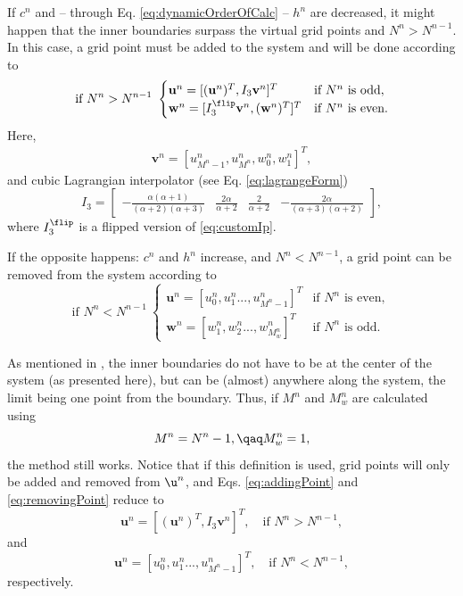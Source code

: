 If $c^n$ and -- through Eq. \eqref{eq:dynamicOrderOfCalc} -- $h^n$ are decreased, it might happen that the inner boundaries surpass the virtual grid points and $N^n > N^{n-1}$. In this case, a grid point must be added to the system and will be done according to
\begin{equation}\label{eq:addingPoint}
    \text{if } N^n>N^{n-1}\ \begin{cases}\mathbf{u}^n = [(\mathbf{u}^n)^T, I_3\mathbf{v}^n]^T & \text{if $N^n $ is odd},\\
    \mathbf{w}^n = [I_3^\flip\mathbf{v}^n, (\mathbf{w}^n)^T]^T & \text{if $ N^n$ is even}.
    \end{cases}
\end{equation}
Here, 
\begin{align*}
\mathbf{v}^n = [u_{M^n-1}^n, u_{M^n}^n, w_0^n, w_1^n]^T,%
\end{align*}
and cubic Lagrangian interpolator (see Eq. \eqref{eq:lagrangeForm})
\begin{equation}\label{eq:customIp}
I_3 = \begin{bmatrix} -\frac{\alpha(\alpha+1)}{(\alpha+2)(\alpha+3)} &\frac{2\alpha}{\alpha+2} &\frac{2}{\alpha+2} 
&-\frac{2\alpha}{(\alpha+3)(\alpha+2)}
\end{bmatrix},
\end{equation}
where $I_3^\flip$ is a flipped version of \eqref{eq:customIp}.

If the opposite happens: $c^n$ and $h^n$ increase, and $N^n<N^{n-1}$, a grid point can be removed from the system according to
\begin{equation}\label{eq:removingPoint}
\text{if } N^n<N^{n-1}\ \begin{cases}
    \mathbf{u}^n = [u_0^n, u_1^n ..., u_{M^n-1}^n]^T & \text{if $N^n$ is even}, \\
        \mathbf{w}^n = [w_1^n, w_2^n ..., w_{M_w^n}^n]^T & \text{if $N^n$ is odd}.
    \end{cases}
\end{equation}

As mentioned in \citeP[G], the inner boundaries do not have to be at the center of the system (as presented here), but can be (almost) anywhere along the system, the limit being one point from the boundary. Thus, if $M^n$ and $M_w^n$ are calculated using 
\begin{equation} \label{eq:alternativeM}
    M^n = N^n - 1,\qaq  M_w^n= 1,
\end{equation}
the method still works. Notice that if this definition is used, grid points will only be added and removed from $\u^n$, and Eqs. \eqref{eq:addingPoint} and \eqref{eq:removingPoint} reduce to
\begin{equation}\label{eq:alternativeAddingPoint}
    \mathbf{u}^n = [(\mathbf{u}^n)^T, I_3\mathbf{v}^n]^T,\quad \text{if } N^n>N^{n-1},
\end{equation}
and 
\begin{equation}
    \mathbf{u}^n = [u_0^n, u_1^n ..., u_{M^n-1}^n]^T,\quad \text{if } N^n<N^{n-1},
\end{equation}
respectively.
